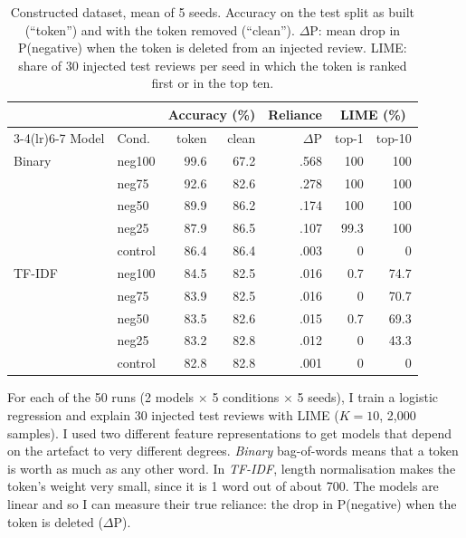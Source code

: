 \begin{table}[t]
\centering\small
\setlength{\tabcolsep}{3.5pt}
\begin{tabular}{@{}llrrrrr@{}}
\toprule
& & \multicolumn{2}{c}{Accuracy (\%)} & Reliance & \multicolumn{2}{c}{LIME (\%)} \\
\cmidrule(lr){3-4}\cmidrule(lr){6-7}
Model & Cond. & token & clean & $\Delta$P & top-1 & top-10 \\
\midrule
Binary & neg100 & 99.6 & 67.2 & .568 & 100 & 100 \\
       & neg75  & 92.6 & 82.6 & .278 & 100 & 100 \\
       & neg50  & 89.9 & 86.2 & .174 & 100 & 100 \\
       & neg25  & 87.9 & 86.5 & .107 & 99.3 & 100 \\
       & control& 86.4 & 86.4 & .003 & 0 & 0 \\
\midrule
TF-IDF & neg100 & 84.5 & 82.5 & .016 & 0.7 & 74.7 \\
       & neg75  & 83.9 & 82.5 & .016 & 0 & 70.7 \\
       & neg50  & 83.5 & 82.6 & .015 & 0.7 & 69.3 \\
       & neg25  & 83.2 & 82.8 & .012 & 0 & 43.3 \\
       & control& 82.8 & 82.8 & .001 & 0 & 0 \\
\bottomrule
\end{tabular}
\caption{Constructed dataset, mean of 5 seeds. Accuracy on the test split as built (``token'') and with the token removed (``clean''). $\Delta$P: mean drop in P(negative) when the token is deleted from an injected review. LIME: share of 30 injected test reviews per seed in which the token is ranked first or in the top ten.}
\label{tab:constructed}
\end{table}

For each of the 50 runs (2 models $\times$ 5 conditions $\times$ 5 seeds), I train a logistic regression and explain 30 injected test reviews with LIME ($K = 10$, 2,000 samples). I used two different feature representations to get models that depend on the artefact to very different degrees. \emph{Binary} bag-of-words means that a token is worth as much as any other word. In \emph{TF-IDF}, length normalisation makes the token’s weight very small, since it is 1 word out of about 700. The models are linear and so I can measure their true reliance: the drop in P(negative) when the token is deleted ($\Delta$P).

